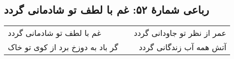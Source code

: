 \begin{center}
\section*{رباعی شمارهٔ ۵۲: غم با لطف تو شادمانی گردد}
\label{sec:052}
\begin{longtable}{l p{0.5cm} r}
غم با لطف تو شادمانی گردد
&&
عمر از نظر تو جاودانی گردد
\\
گر باد به دوزخ برد از کوی تو خاک
&&
آتش همه آب زندگانی گردد
\\
\end{longtable}
\end{center}
